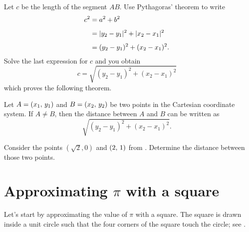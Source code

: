 \documentclass[a4paper,oneside,12pt]{article}
\begin{document}
Let $c$ be the length of the segment $AB$.  Use Pythagoras' theorem to
write
\begin{align*}
c^2
&=
a^2 + b^2 \\[4pt]
&=
\lvert y_2 - y_1\rvert^2 + \lvert x_2 - x_1\rvert^2 \\[4pt]
&=
(y_2 - y_1)^2 + (x_2 - x_1)^2.
\end{align*}
Solve the last expression for $c$ and you obtain
\[
c
=
\sqrt{
  (y_2 - y_1)^2
  +
  (x_2 - x_1)^2
}
\]
which proves the following theorem.

\begin{theorem}
\label{thm:distance_between_two_points}
Let $A = \left\lparen{x_1},\, {y_1}\right\rparen$ and $B = \left\lparen{x_2},\, {y_2}\right\rparen$ be two points in
the Cartesian coordinate system.  If $A \neq B$, then the distance
between $A$ and $B$ can be written as
\[
\sqrt{
  (y_2 - y_1)^2
  +
  (x_2 - x_1)^2
}.
\]
\end{theorem}

\begin{exercise}
Consider the points $(\sqrt{2}\comma 0)$ and $\left\lparen{2},\, {1}\right\rparen$ from
.  Determine the distance
between those two points.
\end{exercise}




\section{Approximating $\pi$ with a square}

Let's start by approximating the value of $\pi$ with a square.  The
square is drawn inside a unit circle such that the four corners of the
square touch the circle; see .
\end{document}
